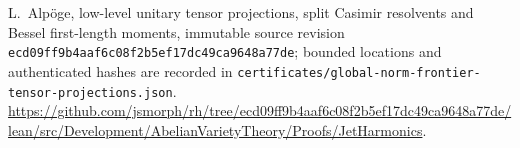 L.~Alp\"oge, low-level unitary tensor projections, split Casimir
resolvents and Bessel first-length moments, immutable source revision
\texttt{ecd09ff9b4aaf6c08f2b5ef17dc49ca9648a77de};
bounded locations and authenticated hashes are recorded in
\texttt{certificates/global-norm-frontier-tensor-projections.json}.
\url{https://github.com/jsmorph/rh/tree/ecd09ff9b4aaf6c08f2b5ef17dc49ca9648a77de/lean/src/Development/AbelianVarietyTheory/Proofs/JetHarmonics}.
